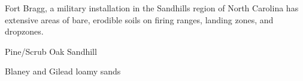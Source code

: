 
Fort Bragg, a military installation in the Sandhills region of North Carolina
has extensive areas of bare, erodible soils
on firing ranges, landing zones, and dropzones. 
%
\citep{sorrie2006}


Pine/Scrub Oak Sandhill 

Blaney and Gilead loamy sands

\citep{sorrie2004}


%
